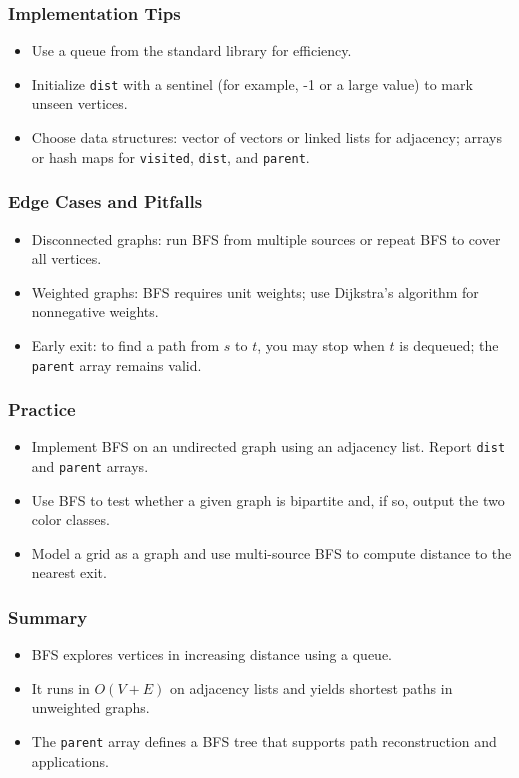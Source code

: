 \documentclass{beamer}
\begin{document}
\begin{frame}
\frametitle{Implementation Tips}
\begin{itemize}
    \item Use a queue from the standard library for efficiency.
    \item Initialize \texttt{dist} with a sentinel (for example, -1 or a large value) to mark unseen vertices.
    \item Choose data structures: vector of vectors or linked lists for adjacency; arrays or hash maps for \texttt{visited}, \texttt{dist}, and \texttt{parent}.
\end{itemize}
\end{frame}

\begin{frame}
\frametitle{Edge Cases and Pitfalls}
\begin{itemize}
    \item Disconnected graphs: run BFS from multiple sources or repeat BFS to cover all vertices.
    \item Weighted graphs: BFS requires unit weights; use Dijkstra's algorithm for nonnegative weights.
    \item Early exit: to find a path from $s$ to $t$, you may stop when $t$ is dequeued; the \texttt{parent} array remains valid.
\end{itemize}
\end{frame}

\begin{frame}
\frametitle{Practice}
\begin{itemize}
    \item Implement BFS on an undirected graph using an adjacency list. Report \texttt{dist} and \texttt{parent} arrays.
    \item Use BFS to test whether a given graph is bipartite and, if so, output the two color classes.
    \item Model a grid as a graph and use multi-source BFS to compute distance to the nearest exit.
\end{itemize}
\end{frame}

\begin{frame}
\frametitle{Summary}
\begin{itemize}
    \item BFS explores vertices in increasing distance using a queue.
    \item It runs in $O(V+E)$ on adjacency lists and yields shortest paths in unweighted graphs.
    \item The \texttt{parent} array defines a BFS tree that supports path reconstruction and applications.
\end{itemize}
\end{frame}
\end{document}
